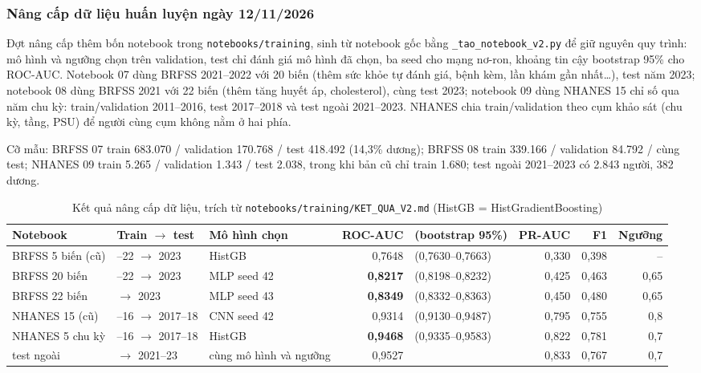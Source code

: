 \subsubsection{Nâng cấp dữ liệu huấn luyện ngày 12/11/2026}
Đợt nâng cấp thêm bốn notebook trong \texttt{notebooks/training}, sinh từ notebook gốc bằng \texttt{\_tao\_notebook\_v2.py} để giữ nguyên quy trình: mô hình và ngưỡng chọn trên validation, test chỉ đánh giá mô hình đã chọn, ba seed cho mạng nơ-ron, khoảng tin cậy bootstrap 95\% cho ROC-AUC. Notebook 07 dùng BRFSS 2021--2022 với 20 biến (thêm sức khỏe tự đánh giá, bệnh kèm, lần khám gần nhất\dots), test năm 2023; notebook 08 dùng BRFSS 2021 với 22 biến (thêm tăng huyết áp, cholesterol), cùng test 2023; notebook 09 dùng NHANES 15 chỉ số qua năm chu kỳ: train/validation 2011--2016, test 2017--2018 và test ngoài 2021--2023. NHANES chia train/validation theo cụm khảo sát (chu kỳ, tầng, PSU) để người cùng cụm không nằm ở hai phía.

Cỡ mẫu: BRFSS 07 train 683.070 / validation 170.768 / test 418.492 (14,3\% dương); BRFSS 08 train 339.166 / validation 84.792 / cùng test; NHANES 09 train 5.265 / validation 1.343 / test 2.038, trong khi bản cũ chỉ train 1.680; test ngoài 2021--2023 có 2.843 người, 382 dương.

\begin{table}[H]\centering\footnotesize\setlength{\tabcolsep}{4pt}
\begin{tabularx}{\linewidth}{>{\raggedright\arraybackslash}X>{\raggedright\arraybackslash}p{2.3cm}>{\raggedright\arraybackslash}p{1.9cm}rlrrr}\toprule
Notebook & Train $\rightarrow$ test & Mô hình chọn & ROC-AUC & (bootstrap 95\%) & PR-AUC & F1 & Ngưỡng\\\midrule
02 BRFSS 5 biến (cũ) & 2021--22 $\rightarrow$ 2023 & HistGB & 0,7648 & (0,7630--0,7663) & 0,330 & 0,398 & --\\
07 BRFSS 20 biến & 2021--22 $\rightarrow$ 2023 & MLP seed 42 & \textbf{0,8217} & (0,8198--0,8232) & 0,425 & 0,463 & 0,65\\
08 BRFSS 22 biến & 2021 $\rightarrow$ 2023 & MLP seed 43 & \textbf{0,8349} & (0,8332--0,8363) & 0,450 & 0,480 & 0,65\\
04 NHANES 15 (cũ) & 2015--16 $\rightarrow$ 2017--18 & CNN seed 42 & 0,9314 & (0,9130--0,9487) & 0,795 & 0,755 & 0,8\\
09 NHANES 5 chu kỳ & 2011--16 $\rightarrow$ 2017--18 & HistGB & \textbf{0,9468} & (0,9335--0,9583) & 0,822 & 0,781 & 0,7\\
09 test ngoài & $\rightarrow$ 2021--23 & cùng mô hình và ngưỡng & 0,9527 & & 0,833 & 0,767 & 0,7\\\bottomrule
\end{tabularx}\caption{Kết quả nâng cấp dữ liệu, trích từ \texttt{notebooks/training/KET\_QUA\_V2.md} (HistGB = HistGradientBoosting)}\label{tab:v2}\end{table}

